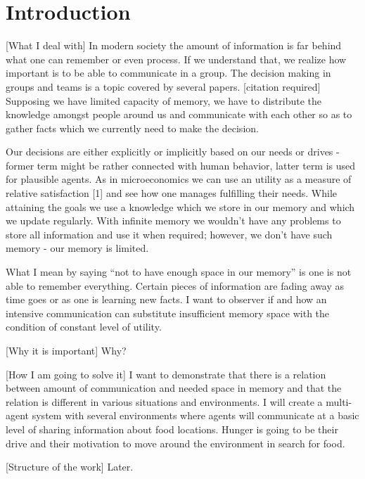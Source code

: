 \chapter{Introduction}

[What I deal with]
In modern society the amount of information is far behind what one can remember or even process. If we understand that, we realize how important is to be able to communicate in a group. The decision making in groups and teams is a topic covered by several papers. [citation required] Supposing we have limited capacity of memory, we have to distribute the knowledge amongst people around us and communicate with each other so as to gather facts which we currently need to make the decision. 

Our decisions are either explicitly or implicitly based on our needs or drives - former term might be rather connected with human behavior, latter term is used for plausible agents. As in microeconomics we can use an utility as a measure of relative satisfaction [1] and see how one manages fulfilling their needs. While attaining the goals we use a knowledge which we store in our memory and which we update regularly. With infinite memory we wouldn’t have any problems to store all information and use it when required; however, we don’t have such memory - our memory is limited. 

What I mean by saying “not to have enough space in our memory” is one is not able to remember everything. Certain pieces of information are fading away as time goes or as one is learning new facts. I want to observer if and how an intensive communication can substitute insufficient memory space with the condition of constant level of utility.

[Why it is important]
Why?

[How I am going to solve it]
I want to demonstrate that there is a relation between amount of communication and needed space in memory and that the relation is different in various situations and environments. I will  
create a multi-agent system with several environments where agents will communicate at a basic level of sharing information about food locations. Hunger is going to be their drive and their motivation to move around the environment in search for food.

[Structure of the work]
Later.